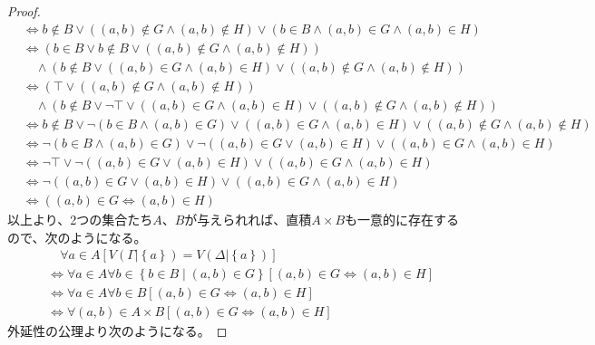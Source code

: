 \documentclass[a4paper]{jsarticle}
\begin{document}
\begin{proof}
\begin{align*}
&\Leftrightarrow b \notin B \vee \left( (a,b) \notin G \land (a,b) \notin H \right) \vee \left( b \in B \land (a,b) \in G \land (a,b) \in H \right)\\
&\Leftrightarrow \left( b \in B \vee b \notin B \vee \left( (a,b) \notin G \land (a,b) \notin H \right) \right) \\ 
&\quad \land \left( b \notin B \vee \left( (a,b) \in G \land (a,b) \in H \right) \vee \left( (a,b) \notin G \land (a,b) \notin H \right) \right)\\
&\Leftrightarrow \left( \top \vee \left( (a,b) \notin G \land (a,b) \notin H \right) \right) \\
&\quad \land \left( b \notin B \vee \neg\top \vee \left( (a,b) \in G \land (a,b) \in H \right) \vee \left( (a,b) \notin G \land (a,b) \notin H \right) \right)\\
&\Leftrightarrow b \notin B \vee \neg\left( b \in B \land (a,b) \in G \right) \vee \left( (a,b) \in G \land (a,b) \in H \right) \vee \left( (a,b) \notin G \land (a,b) \notin H \right)\\
&\Leftrightarrow \neg\left( b \in B \land (a,b) \in G \right) \vee \neg\left( (a,b) \in G \vee (a,b) \in H \right) \vee \left( (a,b) \in G \land (a,b) \in H \right)\\
&\Leftrightarrow \neg\top \vee \neg\left( (a,b) \in G \vee (a,b) \in H \right) \vee \left( (a,b) \in G \land (a,b) \in H \right)\\
&\Leftrightarrow \neg\left( (a,b) \in G \vee (a,b) \in H \right) \vee \left( (a,b) \in G \land (a,b) \in H \right)\\
&\Leftrightarrow \left( (a,b) \in G \Leftrightarrow (a,b) \in H \right)
\end{align*}
以上より、2つの集合たち$A$、$B$が与えられれば、直積$A \times B$も一意的に存在するので、次のようになる。
\begin{align*}
&\quad \forall a \in A\left[ V\left( \varGamma|\left\{ a \right\} \right) = V\left( \Delta|\left\{ a \right\} \right) \right]\\
&\Leftrightarrow \forall a \in A\forall b \in \left\{ b \in B \middle| (a,b) \in G \right\}\left[ (a,b) \in G \Leftrightarrow (a,b) \in H \right]\\
&\Leftrightarrow \forall a \in A\forall b \in B\left[ (a,b) \in G \Leftrightarrow (a,b) \in H \right]\\
&\Leftrightarrow \forall(a,b) \in A \times B\left[ (a,b) \in G \Leftrightarrow (a,b) \in H \right]
\end{align*}
外延性の公理より次のようになる。

\end{proof}
\end{document}
